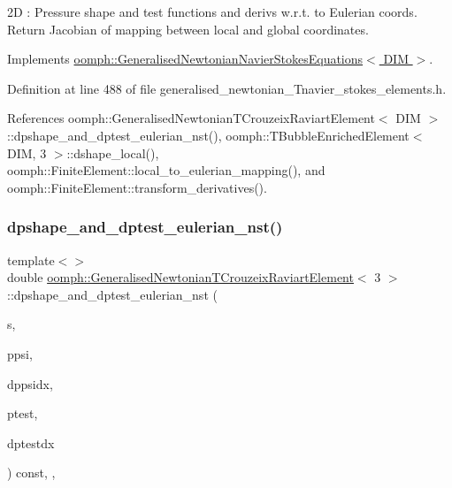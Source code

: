 2D \+: Pressure shape and test functions and derivs w.\+r.\+t. to Eulerian coords. Return Jacobian of mapping between local and global coordinates. 

Implements \hyperlink{classoomph_1_1GeneralisedNewtonianNavierStokesEquations_a00027d27dfdf3c0b72b0d1df9addfdc8}{oomph\+::\+Generalised\+Newtonian\+Navier\+Stokes\+Equations$<$ D\+I\+M $>$}.



Definition at line 488 of file generalised\+\_\+newtonian\+\_\+\+Tnavier\+\_\+stokes\+\_\+elements.\+h.



References oomph\+::\+Generalised\+Newtonian\+T\+Crouzeix\+Raviart\+Element$<$ D\+I\+M $>$\+::dpshape\+\_\+and\+\_\+dptest\+\_\+eulerian\+\_\+nst(), oomph\+::\+T\+Bubble\+Enriched\+Element$<$ D\+I\+M, 3 $>$\+::dshape\+\_\+local(), oomph\+::\+Finite\+Element\+::local\+\_\+to\+\_\+eulerian\+\_\+mapping(), and oomph\+::\+Finite\+Element\+::transform\+\_\+derivatives().

\mbox{\label{classoomph_1_1GeneralisedNewtonianTCrouzeixRaviartElement_a7fd98c3eaa4034ea2f513cceb0c5c096}} 
\subsubsection{\texorpdfstring{dpshape\+\_\+and\+\_\+dptest\+\_\+eulerian\+\_\+nst()}{dpshape\_and\_dptest\_eulerian\_nst()}\hspace{0.1cm}{\footnotesize\ttfamily [3/3]}}
{\footnotesize\ttfamily template$<$$>$ \\
double \hyperlink{classoomph_1_1GeneralisedNewtonianTCrouzeixRaviartElement}{oomph\+::\+Generalised\+Newtonian\+T\+Crouzeix\+Raviart\+Element}$<$ 3 $>$\+::dpshape\+\_\+and\+\_\+dptest\+\_\+eulerian\+\_\+nst (\begin{DoxyParamCaption}\item[{const \hyperlink{classoomph_1_1Vector}{Vector}$<$ double $>$ \&}]{s,  }\item[{\hyperlink{classoomph_1_1Shape}{Shape} \&}]{ppsi,  }\item[{\hyperlink{classoomph_1_1DShape}{D\+Shape} \&}]{dppsidx,  }\item[{\hyperlink{classoomph_1_1Shape}{Shape} \&}]{ptest,  }\item[{\hyperlink{classoomph_1_1DShape}{D\+Shape} \&}]{dptestdx }\end{DoxyParamCaption}) const\hspace{0.3cm}{\ttfamily [inline]}, {\ttfamily [protected]}, {\ttfamily [virtual]}}

